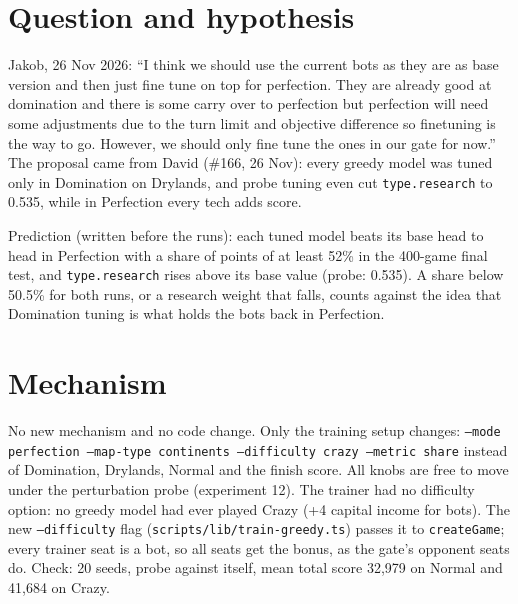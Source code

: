 \documentclass{../polyexp}
\begin{document}

\ExpHeader

\section{Question and hypothesis}
Jakob, 26 Nov 2026: ``I think we should use the current bots as they are as base version and then
just fine tune on top for perfection. They are already good at domination and there is some carry
over to perfection but perfection will need some adjustments due to the turn limit and objective
difference so finetuning is the way to go. However, we should only fine tune the ones in our gate
for now.'' The proposal came from David (\#166, 26 Nov): every greedy model was tuned only in
Domination on Drylands, and probe tuning even cut \texttt{type.research} to 0.535, while in
Perfection every tech adds score.

Prediction (written before the runs): each tuned model beats its base head to head in Perfection
with a share of points of at least 52\% in the 400-game final test, and \texttt{type.research}
rises above its base value (probe: 0.535). A share below 50.5\% for both runs, or a research
weight that falls, counts against the idea that Domination tuning is what holds the bots back in
Perfection.

\section{Mechanism}
No new mechanism and no code change. Only the training setup changes: \texttt{--mode perfection
--map-type continents --difficulty crazy --metric share} instead of Domination, Drylands, Normal
and the finish score. All knobs are free to move under the perturbation probe (experiment 12).
The trainer had no difficulty option: no greedy model had ever played Crazy (+4 capital income
for bots). The new \texttt{--difficulty} flag (\texttt{scripts/lib/train-greedy.ts}) passes it to
\texttt{createGame}; every trainer seat is a bot, so all seats get the bonus, as the gate's
opponent seats do. Check: 20 seeds, probe against itself, mean total score 32,979 on Normal and
41,684 on Crazy.
\end{document}
